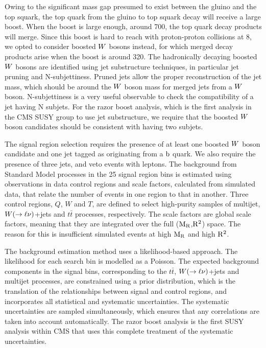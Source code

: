 Owing to the significant mass gap presumed to exist between the gluino and the top squark, the
top quark from the gluino to top squark decay will receive a large boost. 
When the boost is large enough, around 700\GeV, the top quark decay products will merge. Since this
boost is hard to reach with proton-proton collisions at 8\TeV, we opted to consider boosted $W$
bosons instead, for which merged decay products arise when the boost is around 320\GeV. 
The hadronically decaying boosted $W$ bosons are identified using jet substructure techniques, in
particular jet pruning and N-subjettiness. Pruned jets allow the proper reconstruction of the
jet mass, which should be around the $W$ boson mass for merged jets from a $W$ boson. 
N-subjettiness is a very useful observable to check the compatibility of a jet having N subjets.
For the razor boost analysis, which is the first analysis in the CMS SUSY group to
use jet substructure, we require that the boosted $W$ boson candidates should be
consistent with having two subjets. 


The signal region selection requires the presence of at least one boosted $W$ boson candidate and
one jet tagged as originating from a $\mathrm{b}$ quark. We also require the presence of three jets, and
veto events with leptons. 
The background from Standard Model processes in the 25 signal region bins is estimated using
observations in data control regions and scale factors, calculated from simulated data, that
relate the number of events in one region to that in another. 
Three control regions, $Q$, $W$ and $T$, are defined to select high-purity samples of multijet,
$W (\rightarrow \ell \nu)$+jets and $t\bar{t}$ processes, respectively. 
The scale factors are global scale factors, meaning that they are integrated over the full
($\mathrm{M_R}$,$\mathrm{R^2}$) space. The reason for this is insufficient simulated events at high $\mathrm{M_R}$ and high
$\mathrm{R^2}$. 

The background estimation method uses a likelihood-based approach. 
The likelihood for each search bin is modelled as a Poisson. The expected background
components in the signal bins, corresponding to the $t\bar{t}$, $W (\rightarrow \ell \nu)$+jets and
multijet processes, are constrained using a prior distribution, which is the translation of the
relationships between signal and control regions, and incorporates all statistical and systematic
uncertainties. 
The systematic uncertainties are sampled simultaneously, which ensures that any correlations are
taken into account automatically. The razor boost analysis is the first SUSY analysis within CMS
that uses this complete treatment of the systematic uncertainties. 

